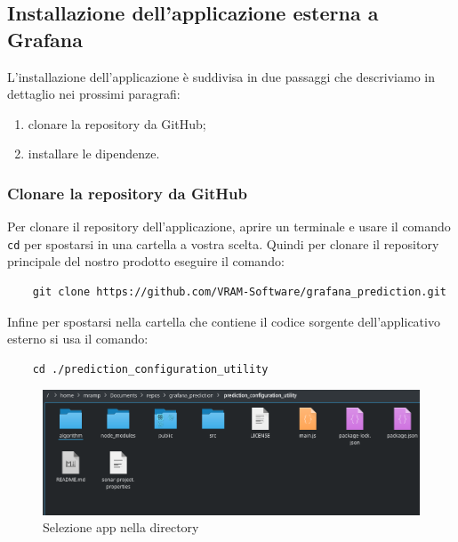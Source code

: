 \subsection{Installazione dell'applicazione esterna a Grafana}
L'installazione dell'applicazione è suddivisa in due passaggi che descriviamo in dettaglio nei prossimi paragrafi:
\begin{enumerate}
    \item clonare la repository da GitHub;
    \item installare le dipendenze.
\end{enumerate}

\subsubsection{Clonare la repository da GitHub}%
Per clonare il repository dell'applicazione, aprire un terminale e usare il comando \texttt{cd} per spostarsi in una cartella a vostra scelta. Quindi per clonare il repository principale del nostro prodotto eseguire il comando:
\begin{verbatim}
	git clone https://github.com/VRAM-Software/grafana_prediction.git
\end{verbatim}
Infine per spostarsi nella cartella che contiene il codice sorgente dell'applicativo esterno si usa il comando:
\begin{verbatim}
	cd ./prediction_configuration_utility
\end{verbatim}

\begin{figure}[H] 	
	\begin{center}
		\includegraphics[width=\textwidth,height=\textheight,keepaspectratio]{img/directoryProject.png}
	\end{center}
	\caption{Selezione app nella directory}	
\end{figure}



